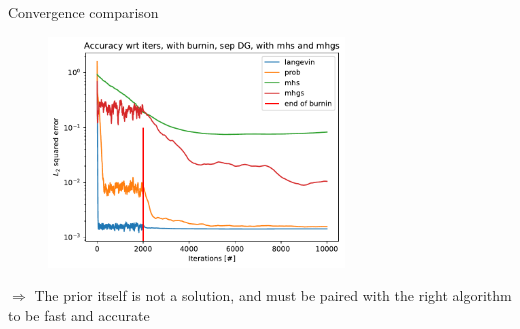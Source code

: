 \documentclass{beamer}
\begin{document}
\begin{frame}{Convergence comparison}
    \begin{figure}[H]
            \centering
            \includegraphics[width=0.7\textwidth]{figures/experiments/mhs_mhgs/iters_acc_comp_iters_no_avg_sep_prob_pl_mhs_mhgs-1.png}
        
        \end{figure}
        $\Longrightarrow$ The prior itself is not a solution, and must be paired with the right algorithm to be fast and accurate
\end{frame}
\end{document}

